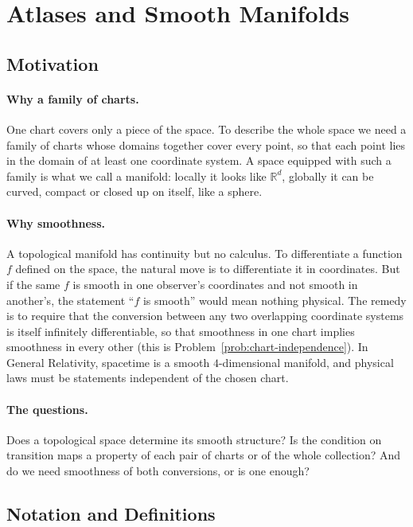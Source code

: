 \documentclass[11pt]{article}
\begin{document}
\section{Atlases and Smooth Manifolds}

\subsection*{Motivation}

\paragraph{Why a family of charts.}
One chart covers only a piece of the space. To describe the whole space we need a family of charts whose domains together cover every point, so that each point lies in the domain of at least one coordinate system. A space equipped with such a family is what we call a manifold: locally it looks like $\mathbb R^d$, globally it can be curved, compact or closed up on itself, like a sphere.

\paragraph{Why smoothness.}
A topological manifold has continuity but no calculus. To differentiate a function $f$ defined on the space, the natural move is to differentiate it in coordinates. But if the same $f$ is smooth in one observer's coordinates and not smooth in another's, the statement ``$f$ is smooth'' would mean nothing physical. The remedy is to require that the conversion between any two overlapping coordinate systems is itself infinitely differentiable, so that smoothness in one chart implies smoothness in every other (this is Problem~\ref{prob:chart-independence}). In General Relativity, spacetime is a smooth $4$-dimensional manifold, and physical laws must be statements independent of the chosen chart.

\paragraph{The questions.}
Does a topological space determine its smooth structure? Is the condition on transition maps a property of each pair of charts or of the whole collection? And do we need smoothness of both conversions, or is one enough?

\subsection*{Notation and Definitions}
\end{document}

